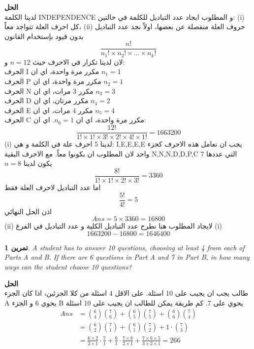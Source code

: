 \documentclass[14pt, a4paper, leqno]{extarticle}
\newcommand{\en}{\textenglish}
\theoremstyle{theoremstyle}
\newtheorem{example}{تمرين}
\newenvironment{solution}{\noindent\textbf{الحل}\vspace{3pt}\\}{}
\begin{document}
	\begin{solution}
		لدينا الكلمة INDEPENDENCE و المطلوب ايجاد عدد التباديل للكلمة في حالتين: (i) كل احرف العلة تتواجد معاً، (ii) حروف العلة منفصلة عن بعضها، اولاً نجد عدد التباديل بدون قيود بإستخدام القانون
		\[
		\frac{n!}{n_1! \times n_2! \times \dots \times n_k!}
		\]
		لان لدينا تكرار في الاحرف حيث \(n=12\) و: \\
		الحرف I مكرر مرة واحدة، اي ان \(n_1=1\) \\
		الحرف P مكرر مرة واحدة، اي ان \(n_2=1\) \\
		الحرف N مكرر 3 مرات، اي ان \(n_3=3\) \\
		الحرف D مكرر مرتان، اي ان \(n_4=2\) \\
		الحرف E مكرر 4 مرات، اي ان \(n_5 = 4\) \\
		الحرف C مكرر مرة واحدة، اي ان \(n_6=1\). اي ان:
		\[
		\frac{12!}{1!\times 1!\times 3!\times 2!\times 4!\times 1!} = 1663200
		\]
		(i) لدينا 5 احرف علة في الكلمة  و هي: \en{I,E,E,E,E} يجب ان نعامل هذه الاحرف كجزء واحد لان المطلوب ان بكونوا معاً. مع الاحرف البقية \en{N,N,N,D,D,P,C} التي عددها 7 يكون لدينا \(n=8\)
	\[
	\frac{8!}{1!\times 1!\times 2!\times 3!} = 3360
	\]
	اما عدد التباديل لاحرف العلة فقط 
	\[
	\frac{5!}{4!} = 5
	\]
	اذن  الحل النهائي
	\[
	\textit{Ans} = 5 \times 3360 = 16800
	\]
	(ii) لايجاد المطلوب هنا نطرح عدد التباديل الكلية و عدد التباديل في الفرع (i)
	\[
	1663200 - 16800 = 1646400
	\]
	\end{solution}
	
	\begin{example}
		\en{A student has to answer 10 questions, choosing at least 4 from each of Parts A and B. If there are 6 questions in Part A and 7 in Part B, in how many ways can the student choose 10 questions?}
	\end{example}
	
	\begin{solution}
		طالب يجب ان يجيب على 10 اسئلة. على الاقل 4 اسئلة من كلا الجزئين، اذا كان الجزء  A يحوي 6 و الجزء B يحوي على 7. كم طريقة يمكن للطالب ان يجيب على 10 اسئلة
		\begin{align*}
		\textit{Ans} &= \binom{6}{4}\binom{7}{6} + \binom{6}{5}\binom{7}{5}+\binom{6}{6}\binom{7}{4}\\
		& = \binom{6}{2}\binom{7}{1} + \binom{6}{1}\binom{7}{2}+1\cdot\binom{7}{3}\\
		& = \frac{6\times 2}{2\times1}\cdot\frac{7}{1} + \frac{6}{1}\cdot\frac{7\times6}{2\times 1}+\frac{7\times6\times5}{3\times2\times1} = 266
	\end{align*}
	\end{solution}
	
\end{document}

